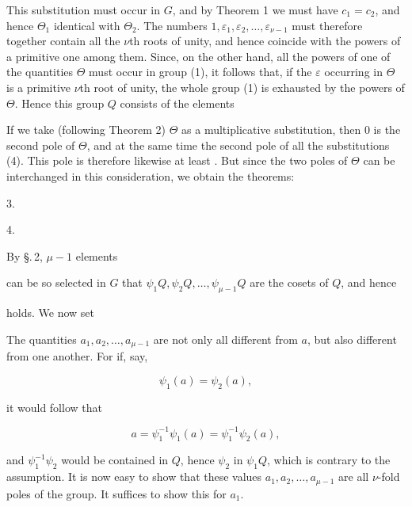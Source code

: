 This substitution must occur in $G$, and by Theorem 1 we must have $c_1 = c_2$, and hence $\Theta_1$ identical with $\Theta_2$. The numbers $1, \varepsilon_1, \varepsilon_2, \ldots, \varepsilon_{\nu-1}$ must therefore together contain all the $\nu$th roots of unity, and hence coincide with the powers of a primitive one among them. Since, on the other hand, all the powers of one of the quantities $\Theta$ must occur in group (1), it follows that, if the $\varepsilon$ occurring in $\Theta$ is a primitive $\nu$th root of unity, the whole group (1) is exhausted by the powers of $\Theta$. %
Hence this group $Q$ consists of the elements


If we take (following Theorem 2) $\Theta$ as a multiplicative substitution, then 0 is the second pole of $\Theta$, and at the same time the second pole of all the substitutions (4). This pole is therefore likewise at least . But since the two poles of $\Theta$ can be interchanged in this consideration, we obtain the theorems:

3. 

4. 

By \S.\,2, $\mu - 1$ elements


can be so selected in $G$ that $\psi_1 Q, \psi_2 Q, \ldots, \psi_{\mu-1} Q$ are the cosets of $Q$, and hence


holds. We now set


The quantities $a_1, a_2, \ldots, a_{\mu-1}$ are not only all different from $a$, but also different from one another. For if, say,

\[ \psi_1(a) = \psi_2(a), \]

it would follow that

\[ a = \psi_1^{-1}\psi_1(a) = \psi_1^{-1}\psi_2(a), \]

and $\psi_1^{-1}\psi_2$ would be contained in $Q$, hence $\psi_2$ in $\psi_1 Q$, which is contrary to the assumption. It is now easy to show that these values $a_1, a_2, \ldots, a_{\mu-1}$ are all $\nu$-fold poles of the group. It suffices to show this for $a_1$.
